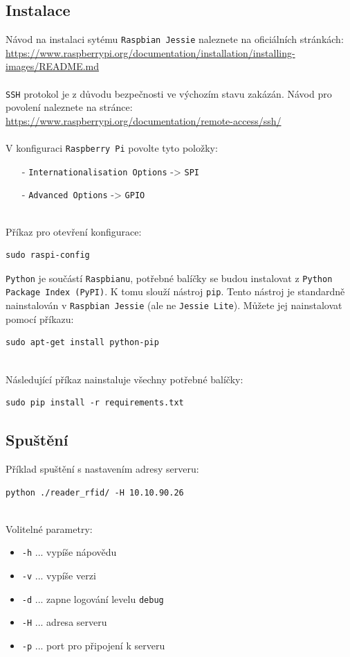 \documentclass[czech,BP]{thesiskiv}
\begin{document}
\subsection{Instalace}
Návod na instalaci sytému \texttt{Raspbian Jessie} naleznete na oficiálních stránkách: 
\\ 
\url{https://www.raspberrypi.org/documentation/installation/installing-images/README.md}
\\\\
\texttt{SSH} protokol je z důvodu bezpečnosti ve výchozím stavu zakázán. Návod pro povolení naleznete na stránce: 
\\
\url{https://www.raspberrypi.org/documentation/remote-access/ssh/}
\\\\
V konfiguraci \texttt{Raspberry Pi} povolte tyto položky:
\begin{itemize}[noitemsep]
\item [-] \texttt{Internationalisation Options} -> \texttt{SPI}
\item [-] \texttt{Advanced Options} -> \texttt{GPIO}
\end{itemize}
\ \\
Příkaz pro otevření konfigurace:
\begin{verbatim}
sudo raspi-config
\end{verbatim}


\newpage	
\noindent
\texttt{Python} je součástí \texttt{Raspbianu}, potřebné balíčky se budou instalovat z \texttt{Python Package Index (PyPI)}. K tomu slouží nástroj \texttt{pip}. Tento nástroj je standardně nainstalován v \texttt{Raspbian Jessie} (ale ne \texttt{Jessie Lite}). Můžete jej nainstalovat pomocí příkazu: 
\begin{verbatim}
sudo apt-get install python-pip
\end{verbatim}
\ \\
Následující příkaz nainstaluje všechny potřebné balíčky: 
\begin{verbatim}
sudo pip install -r requirements.txt
\end{verbatim}

\subsection{Spuštění}
Příklad spuštění s nastavením adresy serveru:
\begin{verbatim}
python ./reader_rfid/ -H 10.10.90.26
\end{verbatim}
\ \\
Volitelné parametry:
\begin{itemize}[noitemsep]
	\item \texttt{-h} ... vypíše nápovědu
	\item \texttt{-v} ... vypíše verzi
	\item \texttt{-d} ... zapne logování levelu \texttt{debug}
	\item \texttt{-H} ... adresa serveru
	\item \texttt{-p} ... port pro připojení k serveru
\end{itemize}
\end{document}
